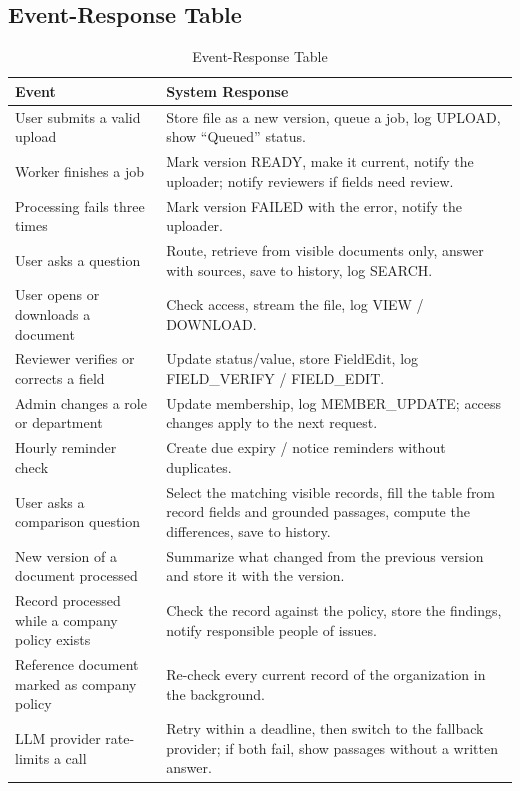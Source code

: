 \subsection{Event-Response Table}
\begin{table}[H]\centering
\caption{Event-Response Table}\label{tab:events}
\begin{tabularx}{\textwidth}{|p{4.6cm}|X|}\hline
\textbf{Event} & \textbf{System Response} \\ \hline
User submits a valid upload & Store file as a new version, queue a job, log UPLOAD, show ``Queued'' status. \\ \hline
Worker finishes a job & Mark version READY, make it current, notify the uploader; notify reviewers if fields need review. \\ \hline
Processing fails three times & Mark version FAILED with the error, notify the uploader. \\ \hline
User asks a question & Route, retrieve from visible documents only, answer with sources, save to history, log SEARCH. \\ \hline
User opens or downloads a document & Check access, stream the file, log VIEW / DOWNLOAD. \\ \hline
Reviewer verifies or corrects a field & Update status/value, store FieldEdit, log FIELD\_VERIFY / FIELD\_EDIT. \\ \hline
Admin changes a role or department & Update membership, log MEMBER\_UPDATE; access changes apply to the next request. \\ \hline
Hourly reminder check & Create due expiry / notice reminders without duplicates. \\ \hline
User asks a comparison question & Select the matching visible records, fill the table from record fields and grounded passages, compute the differences, save to history. \\ \hline
New version of a document processed & Summarize what changed from the previous version and store it with the version. \\ \hline
Record processed while a company policy exists & Check the record against the policy, store the findings, notify responsible people of issues. \\ \hline
Reference document marked as company policy & Re-check every current record of the organization in the background. \\ \hline
LLM provider rate-limits a call & Retry within a deadline, then switch to the fallback provider; if both fail, show passages without a written answer. \\ \hline
\end{tabularx}
\end{table}

